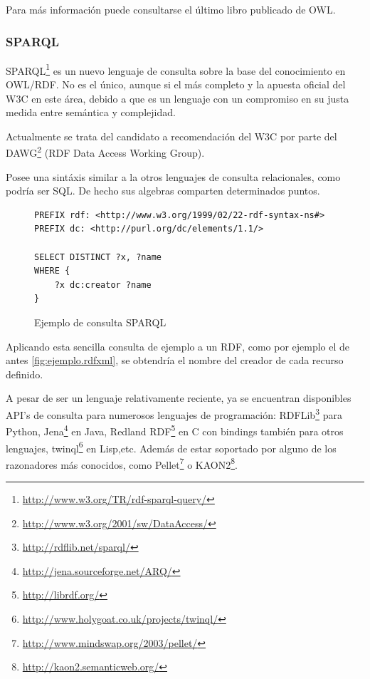 Para más información puede consultarse el último libro publicado de 
OWL\cite{OWLBook}.

\subsubsection{SPARQL}

SPARQL\footnote{\url{http://www.w3.org/TR/rdf-sparql-query/}} es un nuevo lenguaje
de consulta sobre la base del conocimiento en OWL/RDF. No es el único\cite{ComparisonRDFQuery},
aunque si el más completo y la apuesta oficial del W3C en este área, debido a que es
un lenguaje con un compromiso en su justa medida entre semántica y 
complejidad\cite{SemanticsComplexitySPARQL}. 

Actualmente se trata del candidato a recomendación del W3C por parte del 
DAWG\footnote{\url{http://www.w3.org/2001/sw/DataAccess/}} (RDF Data Access Working 
Group).

Posee una sintáxis similar a la otros lenguajes de consulta relacionales, como
podría ser SQL. De hecho sus algebras comparten\cite{RelationalAlgebraSPARQL} 
determinados puntos. 

\begin{figure}[H]
\lstset{language=XML}
\begin{lstlisting}
PREFIX rdf: <http://www.w3.org/1999/02/22-rdf-syntax-ns#>
PREFIX dc: <http://purl.org/dc/elements/1.1/>

SELECT DISTINCT ?x, ?name
WHERE {
	?x dc:creator ?name
}
\end{lstlisting}
\caption{Ejemplo de consulta SPARQL}
\label{fig:ejemplo.sparql}
\end{figure}

Aplicando esta sencilla consulta de ejemplo a un RDF, como por ejemplo el de 
antes \ref{fig:ejemplo.rdfxml}, se obtendría el nombre del creador de cada recurso
definido.

A pesar de ser un lenguaje relativamente reciente, ya se encuentran disponibles
API's de consulta para numerosos lenguajes de programación: 
RDFLib\footnote{\url{http://rdflib.net/sparql/}} para Python, 
Jena\footnote{\url{http://jena.sourceforge.net/ARQ/}} en Java, 
Redland RDF\footnote{\url{http://librdf.org/}} en C con bindings también para 
otros lenguajes, twinql\footnote{\url{http://www.holygoat.co.uk/projects/twinql/}} 
en Lisp,etc. Además de estar soportado por alguno de los razonadores más conocidos, 
como Pellet\footnote{\url{http://www.mindswap.org/2003/pellet/}} o 
KAON2\footnote{\url{http://kaon2.semanticweb.org/}}.

